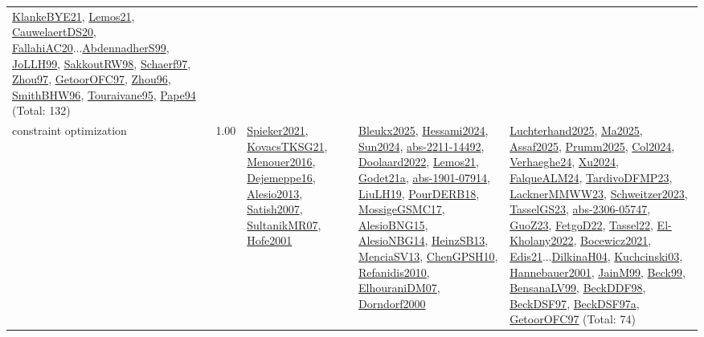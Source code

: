 {\begin{longtable}{p{3cm}r>{\raggedright\arraybackslash}p{6cm}>{\raggedright\arraybackslash}p{6cm}>{\raggedright\arraybackslash}p{8cm}}
\hyperref[detail:KlankeBYE21]{KlankeBYE21}, \hyperref[detail:Lemos21]{Lemos21}, \hyperref[detail:CauwelaertDS20]{CauwelaertDS20}, \hyperref[detail:FallahiAC20]{FallahiAC20}...\hyperref[detail:AbdennadherS99]{AbdennadherS99}, \hyperref[detail:JoLLH99]{JoLLH99}, \hyperref[detail:SakkoutRW98]{SakkoutRW98}, \hyperref[detail:Schaerf97]{Schaerf97}, \hyperref[detail:Zhou97]{Zhou97}, \hyperref[detail:GetoorOFC97]{GetoorOFC97}, \hyperref[detail:Zhou96]{Zhou96}, \hyperref[detail:SmithBHW96]{SmithBHW96}, \hyperref[detail:Touraivane95]{Touraivane95}, \hyperref[detail:Pape94]{Pape94} (Total: 132)\\
\index{constraint optimization}\index{CP!constraint optimization}constraint optimization &  1.00 & \hyperref[detail:Spieker2021]{Spieker2021}, \hyperref[detail:KovacsTKSG21]{KovacsTKSG21}, \hyperref[detail:Menouer2016]{Menouer2016}, \hyperref[detail:Dejemeppe16]{Dejemeppe16}, \hyperref[detail:Alesio2013]{Alesio2013}, \hyperref[detail:Satish2007]{Satish2007}, \hyperref[detail:SultanikMR07]{SultanikMR07}, \hyperref[detail:Hofe2001]{Hofe2001} & \hyperref[detail:Bleukx2025]{Bleukx2025}, \hyperref[detail:Hessami2024]{Hessami2024}, \hyperref[detail:Sun2024]{Sun2024}, \hyperref[detail:abs-2211-14492]{abs-2211-14492}, \hyperref[detail:Doolaard2022]{Doolaard2022}, \hyperref[detail:Lemos21]{Lemos21}, \hyperref[detail:Godet21a]{Godet21a}, \hyperref[detail:abs-1901-07914]{abs-1901-07914}, \hyperref[detail:LiuLH19]{LiuLH19}, \hyperref[detail:PourDERB18]{PourDERB18}, \hyperref[detail:MossigeGSMC17]{MossigeGSMC17}, \hyperref[detail:AlesioBNG15]{AlesioBNG15}, \hyperref[detail:AlesioNBG14]{AlesioNBG14}, \hyperref[detail:HeinzSB13]{HeinzSB13}, \hyperref[detail:MenciaSV13]{MenciaSV13}, \hyperref[detail:ChenGPSH10]{ChenGPSH10}, \hyperref[detail:Refanidis2010]{Refanidis2010}, \hyperref[detail:ElhouraniDM07]{ElhouraniDM07}, \hyperref[detail:Dorndorf2000]{Dorndorf2000} & \hyperref[detail:Luchterhand2025]{Luchterhand2025}, \hyperref[detail:Ma2025]{Ma2025}, \hyperref[detail:Assaf2025]{Assaf2025}, \hyperref[detail:Prumm2025]{Prumm2025}, \hyperref[detail:Col2024]{Col2024}, \hyperref[detail:Verhaeghe24]{Verhaeghe24}, \hyperref[detail:Xu2024]{Xu2024}, \hyperref[detail:FalqueALM24]{FalqueALM24}, \hyperref[detail:TardivoDFMP23]{TardivoDFMP23}, \hyperref[detail:LacknerMMWW23]{LacknerMMWW23}, \hyperref[detail:Schweitzer2023]{Schweitzer2023}, \hyperref[detail:TasselGS23]{TasselGS23}, \hyperref[detail:abs-2306-05747]{abs-2306-05747}, \hyperref[detail:GuoZ23]{GuoZ23}, \hyperref[detail:FetgoD22]{FetgoD22}, \hyperref[detail:Tassel22]{Tassel22}, \hyperref[detail:El-Kholany2022]{El-Kholany2022}, \hyperref[detail:Bocewicz2021]{Bocewicz2021}, \hyperref[detail:Edis21]{Edis21}...\hyperref[detail:DilkinaH04]{DilkinaH04}, \hyperref[detail:Kuchcinski03]{Kuchcinski03}, \hyperref[detail:Hannebauer2001]{Hannebauer2001}, \hyperref[detail:JainM99]{JainM99}, \hyperref[detail:Beck99]{Beck99}, \hyperref[detail:BensanaLV99]{BensanaLV99}, \hyperref[detail:BeckDDF98]{BeckDDF98}, \hyperref[detail:BeckDSF97]{BeckDSF97}, \hyperref[detail:BeckDSF97a]{BeckDSF97a}, \hyperref[detail:GetoorOFC97]{GetoorOFC97} (Total: 74)\\

\end{longtable}}
